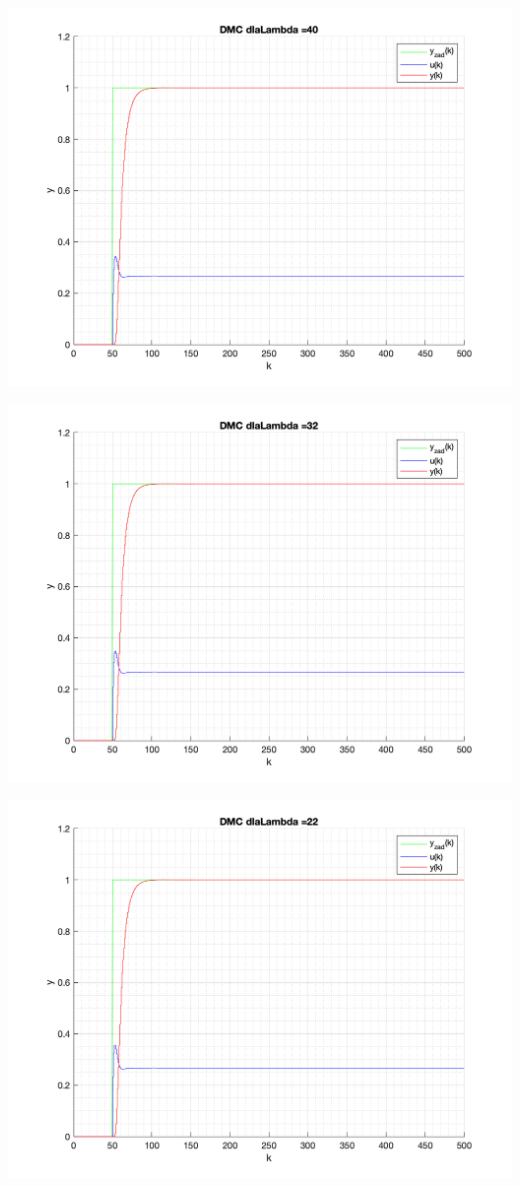 \documentclass[a4paper, 11pt]{article}
\begin{document}
\begin{enumerate}
 \includegraphics[width=\linewidth]{./ModelsP4_Lambda/P4_DMC_Lambda_40_png.png} 
 
 \includegraphics[width=\linewidth]{./ModelsP4_Lambda/P4_DMC_Lambda_32_png.png} 
 
 \includegraphics[width=\linewidth]{./ModelsP4_Lambda/P4_DMC_Lambda_22_png.png} 
 

\end{enumerate}
\end{document}
